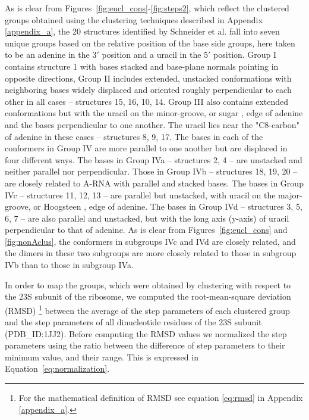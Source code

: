 As  is clear  from  Figures~\ref{fig:eucl_cons}-\ref{fig:steps2}, which
reflect the clustered groups  obtained using the clustering techniques
described in  Appendix \ref{appendix_a}, the  20 structures identified
by  Schneider et  al.   fall into  seven  unique groups  based on  the
relative position of the base side groups, here taken to be an adenine
in  the 3$'$  position and  a uracil  in the  5$'$ position.   Group I
contains  structure  {1} with  bases  stacked  and base-plane  normals
pointing in opposite directions, Group II includes extended, unstacked
conformations  with neighboring  bases widely  displaced  and oriented
roughly perpendicular  to each other  in all cases --  structures {15,
  16, 10, 14}. Group III also contains extended conformations but with
the uracil on the minor-groove, or sugar \cite{leontis1998}, edge of
adenine and the  bases perpendicular to one another.   The uracil lies
near the  "C8-carbon" of adenine in  these cases --  structures {8, 9,
  17}.   The bases  in each  of the  conformers in  Group IV  are more
parallel to one another but are displaced in four different ways.  The
bases in Group  IVa -- structures {2, 4} --  are unstacked and neither
parallel nor perpendicular.  Those in Group IVb -- structures {18, 19,
  20} -- are closely related to A-RNA with parallel and stacked bases.
The bases in Group IVc --  structures {11, 12, 13} -- are parallel but
unstacked,   with   uracil   on   the  major-groove,   or   Hoogsteen
\cite{leontis1998},  edge  of  adenine.   The  bases in  Group  IVd  --
structures {3, 5,  6, 7} -- are also parallel  and unstacked, but with
the long axis (y-axis) of uracil perpendicular to that of adenine.  As
is clear from  Figures~\ref{fig:eucl_cons} and \ref{fig:nonAclus}, the
conformers  in subgroups  IVc and  IVd  are closely  related, and  the
dimers in  these two  subgroups are more  closely related to  those in
subgroup IVb than to those in subgroup IVa.

In order  to map  the groups, which  were obtained by  clustering with
respect  to  the  23S  subunit   of  the  ribosome,  we  computed  the
root-mean-square  deviation   (RMSD)  \footnote{For  the  mathematical
  definition   of  RMSD   see  equation   \ref{eq:rmsd}   in  Appendix
  \ref{appendix_a}.}  between  the average  of the step  parameters of
each  clustered group  and  the step  parameters  of all  dinucleotide
residues of the 23S subunit (PDB\_ID:1JJ2).  Before computing the RMSD
values we normalized  the step parameters using the  ratio between the
difference of step parameters to their minimum value, and their range.
This is expressed in Equation~\ref{eq:normalization}.

